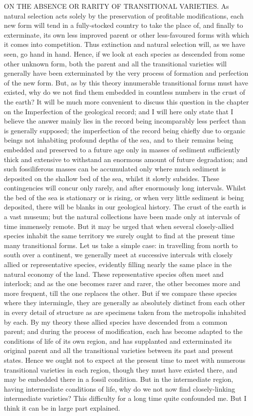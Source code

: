 ON THE ABSENCE OR RARITY OF TRANSITIONAL VARIETIES.
As natural selection acts solely by the preservation of profitable modifications, each new form will tend in a fully-stocked country to take the place of, and finally to exterminate, its own less improved parent or other less-favoured forms with which it comes into competition. Thus extinction and natural selection will, as we have seen, go hand in hand. Hence, if we look at each species as descended from some other unknown form, both the parent and all the transitional varieties will generally have been exterminated by the very process of formation and perfection of the new form.
But, as by this theory innumerable transitional forms must have existed, why do we not find them embedded in countless numbers in the crust of the earth? It will be much more convenient to discuss this question in the chapter on the Imperfection of the geological record; and I will here only state that I believe the answer mainly lies in the record being incomparably less perfect than is generally supposed; the imperfection of the record being chiefly due to organic beings not inhabiting profound depths of the sea, and to their remains being embedded and preserved to a future age only in masses of sediment sufficiently thick and extensive to withstand an enormous amount of future degradation; and such fossiliferous masses can be accumulated only where much sediment is deposited on the shallow bed of the sea, whilst it slowly subsides. These contingencies will concur only rarely, and after enormously long intervals. Whilst the bed of the sea is stationary or is rising, or when very little sediment is being deposited, there will be blanks in our geological history. The crust of the earth is a vast museum; but the natural collections have been made only at intervals of time immensely remote.
But it may be urged that when several closely-allied species inhabit the same territory we surely ought to find at the present time many transitional forms. Let us take a simple case: in travelling from north to south over a continent, we generally meet at successive intervals with closely allied or representative species, evidently filling nearly the same place in the natural economy of the land. These representative species often meet and interlock; and as the one becomes rarer and rarer, the other becomes more and more frequent, till the one replaces the other. But if we compare these species where they intermingle, they are generally as absolutely distinct from each other in every detail of structure as are specimens taken from the metropolis inhabited by each. By my theory these allied species have descended from a common parent; and during the process of modification, each has become adapted to the conditions of life of its own region, and has supplanted and exterminated its original parent and all the transitional varieties between its past and present states. Hence we ought not to expect at the present time to meet with numerous transitional varieties in each region, though they must have existed there, and may be embedded there in a fossil condition. But in the intermediate region, having intermediate conditions of life, why do we not now find closely-linking intermediate varieties? This difficulty for a long time quite confounded me. But I think it can be in large part explained.
